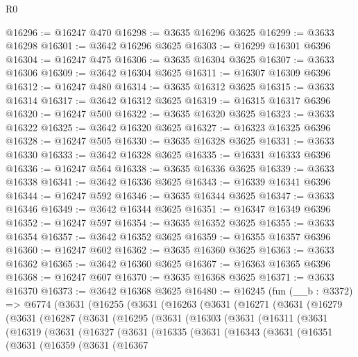 \begin{lexlean}{R0}
\begin{coremodule}
@16296 := @16247 @470
@16298 := @3635 @16296 @3625
@16299 := @3633 @16298
@16301 := @3642 @16296 @3625
@16303 := @16299 @16301 @6396
@16304 := @16247 @475
@16306 := @3635 @16304 @3625
@16307 := @3633 @16306
@16309 := @3642 @16304 @3625
@16311 := @16307 @16309 @6396
@16312 := @16247 @480
@16314 := @3635 @16312 @3625
@16315 := @3633 @16314
@16317 := @3642 @16312 @3625
@16319 := @16315 @16317 @6396
@16320 := @16247 @500
@16322 := @3635 @16320 @3625
@16323 := @3633 @16322
@16325 := @3642 @16320 @3625
@16327 := @16323 @16325 @6396
@16328 := @16247 @505
@16330 := @3635 @16328 @3625
@16331 := @3633 @16330
@16333 := @3642 @16328 @3625
@16335 := @16331 @16333 @6396
@16336 := @16247 @564
@16338 := @3635 @16336 @3625
@16339 := @3633 @16338
@16341 := @3642 @16336 @3625
@16343 := @16339 @16341 @6396
@16344 := @16247 @592
@16346 := @3635 @16344 @3625
@16347 := @3633 @16346
@16349 := @3642 @16344 @3625
@16351 := @16347 @16349 @6396
@16352 := @16247 @597
@16354 := @3635 @16352 @3625
@16355 := @3633 @16354
@16357 := @3642 @16352 @3625
@16359 := @16355 @16357 @6396
@16360 := @16247 @602
@16362 := @3635 @16360 @3625
@16363 := @3633 @16362
@16365 := @3642 @16360 @3625
@16367 := @16363 @16365 @6396
@16368 := @16247 @607
@16370 := @3635 @16368 @3625
@16371 := @3633 @16370
@16373 := @3642 @16368 @3625
@16480 := @16245
    (fun (__b : @3372) =>
    @6774
      (@3631
        (@16255
          (@3631
            (@16263
              (@3631
                (@16271
                  (@3631
                    (@16279
                      (@3631
                        (@16287
                          (@3631
                            (@16295
                              (@3631
                                (@16303
                                  (@3631
                                    (@16311
                                      (@3631
                                        (@16319
                                          (@3631
                                            (@16327
                                              (@3631
                                                (@16335
                                                  (@3631
                                                    (@16343
                                                      (@3631
                                                        (@16351
                                                          (@3631
                                                            (@16359
                                                              (@3631
                                                                (@16367

\end{coremodule}
\end{lexlean}
